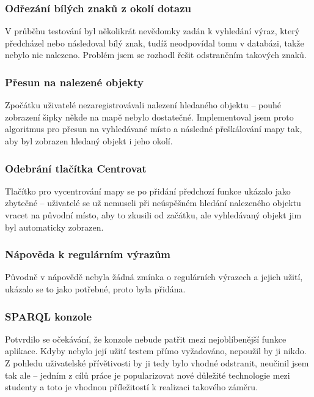 \subsubsection*{Odřezání bílých znaků z okolí dotazu}
V průběhu testování byl několikrát nevědomky zadán k vyhledání výraz, který předcházel nebo následoval bílý znak, tudíž neodpovídal tomu v databázi, takže nebylo nic nalezeno. Problém jsem se rozhodl řešit odstraněním takových znaků.
\subsubsection*{Přesun na nalezené objekty}
Zpočátku uživatelé nezaregistrovávali nalezení hledaného objektu -- pouhé zobrazení šipky někde na mapě nebylo dostatečné. Implementoval jsem proto algoritmus pro přesun na vyhledávané místo a následné přeškálování mapy tak, aby byl zobrazen hledaný objekt i jeho okolí.
\subsubsection*{Odebrání tlačítka Centrovat}
Tlačítko pro vycentrování mapy se po přidání předchozí funkce ukázalo jako zbytečné -- uživatelé se už nemuseli při neúspěšném hledání nalezeného objektu vracet na původní místo, aby to zkusili od začátku, ale vyhledávaný objekt jim byl automaticky zobrazen.
\subsubsection*{Nápověda k regulárním výrazům}
Původně v nápovědě nebyla žádná zmínka o regulárních výrazech a jejich užití, ukázalo se to jako potřebné, proto byla přidána.
\subsubsection*{SPARQL konzole}
Potvrdilo se očekávání, že  konzole nebude patřit mezi nejoblíbenější funkce aplikace. Kdyby nebylo její užití testem přímo vyžadováno, nepoužil by ji nikdo. Z pohledu uživatelské přívětivosti by ji tedy bylo vhodné odstranit, neučinil jsem tak ale -- jedním z cílů práce je popularizovat nové důležité technologie mezi studenty a toto je vhodnou příležitostí k realizaci takového záměru.

